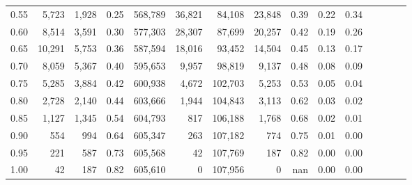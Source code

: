 \begin{tabular}{rrrcrrrrrrrrrrr}
0.55 &    5,723 &   1,928 &                                       0.25 &  568,789 &   36,821 &   84,108 &   23,848 &  0.39 &  0.22 &                         0.34 \\
0.60 &    8,514 &   3,591 &                                       0.30 &  577,303 &   28,307 &   87,699 &   20,257 &  0.42 &  0.19 &                         0.26 \\
0.65 &   10,291 &   5,753 &                                       0.36 &  587,594 &   18,016 &   93,452 &   14,504 &  0.45 &  0.13 &                         0.17 \\
0.70 &    8,059 &   5,367 &                                       0.40 &  595,653 &    9,957 &   98,819 &    9,137 &  0.48 &  0.08 &                         0.09 \\
0.75 &    5,285 &   3,884 &                                       0.42 &  600,938 &    4,672 &  102,703 &    5,253 &  0.53 &  0.05 &                         0.04 \\
0.80 &    2,728 &   2,140 &                                       0.44 &  603,666 &    1,944 &  104,843 &    3,113 &  0.62 &  0.03 &                         0.02 \\
0.85 &    1,127 &   1,345 &                                       0.54 &  604,793 &      817 &  106,188 &    1,768 &  0.68 &  0.02 &                         0.01 \\
0.90 &      554 &     994 &                                       0.64 &  605,347 &      263 &  107,182 &      774 &  0.75 &  0.01 &                         0.00 \\
0.95 &      221 &     587 &                                       0.73 &  605,568 &       42 &  107,769 &      187 &  0.82 &  0.00 &                         0.00 \\
1.00 &       42 &     187 &                                       0.82 &  605,610 &        0 &  107,956 &        0 &   nan &  0.00 &                         0.00 \\
\bottomrule
\end{tabular}
